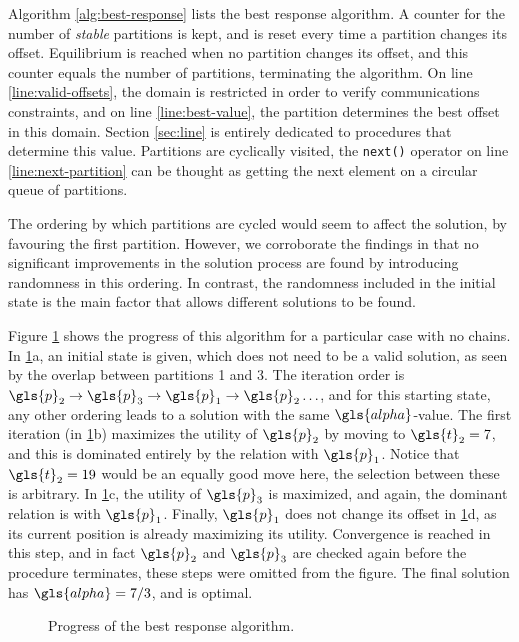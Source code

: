 \documentclass[main.tex]{subfiles}
\begin{document}
Algorithm \ref{alg:best-response} lists the best response algorithm.
A counter for the number of \textit{stable} partitions is kept, and is reset every time a partition changes its offset.
Equilibrium is reached when no partition changes its offset, and this counter equals the number of partitions, terminating the algorithm.
On line \ref{line:valid-offsets}, the domain is restricted in order to verify communications constraints, and on line \ref{line:best-value}, the partition determines the best offset in this domain. 
Section \ref{sec:line} is entirely dedicated to procedures that determine this value.
Partitions are cyclically visited, the \texttt{next()} operator on line \ref{line:next-partition} can be thought as getting the next element on a circular queue of partitions.

The ordering by which partitions are cycled would seem to affect the solution, by favouring the first partition.
However, we corroborate the findings in \cite{pira2016line} that no significant improvements in the solution process are found by introducing randomness in this ordering.
In contrast, the randomness included in the initial state is the main factor that allows different solutions to be found.

Figure \ref{fig:best-response-example} shows the progress of this algorithm for a particular case with no chains.
In \ref{fig:best-response-example}a, an initial state is given, which does not need to be a valid solution, as seen by the overlap between partitions 1 and 3.
The iteration order is $\gls{p}_2\rightarrow\gls{p}_3\rightarrow\gls{p}_1\rightarrow\gls{p}_2\ldots$, and for this starting state, any other ordering leads to a solution with the same $\gls{alpha}$-value.
The first iteration (in \ref{fig:best-response-example}b) maximizes the utility of $\gls{p}_2$ by moving to $\gls{t}_2=7$, and this is dominated entirely by the relation with $\gls{p}_1$. 
Notice that $\gls{t}_2=19$ would be an equally good move here, the selection between these is arbitrary.
In \ref{fig:best-response-example}c, the utility of $\gls{p}_3$ is maximized, and again, the dominant relation is with $\gls{p}_1$.
Finally, $\gls{p}_1$ does not change its offset in \ref{fig:best-response-example}d, as its current position is already maximizing its utility.
Convergence is reached in this step, and in fact $\gls{p}_2$ and $\gls{p}_3$ are checked again before the procedure terminates, these steps were omitted from the figure.
The final solution has $\gls{alpha}=7/3$, and is optimal.

\begin{figure}[htbp]
    \centering
    \resizebox{\linewidth}{!}{}
    \caption{Progress of the best response algorithm.}
    \label{fig:best-response-example}
\end{figure}
\end{document}
